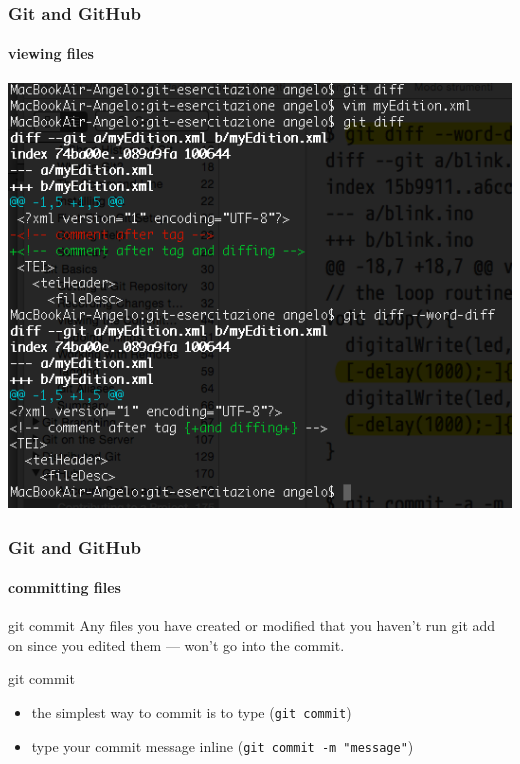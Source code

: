 \begin{frame}
	\frametitle{Git and GitHub}
    \framesubtitle{viewing files}
    \addtocounter{nframe}{1}
	
	\begin{center}
		\includegraphics[width=.8\textwidth]{imgs/Diffing-line-word.png}
	\end{center}

\end{frame}

\begin{frame}
	\frametitle{Git and GitHub}
    \framesubtitle{committing files}
    \addtocounter{nframe}{1}

	\begin{block}{git commit}
		Any files you have created or modified that you haven’t run git add on since you edited them — won’t go into the commit.
	\end{block}

	\begin{block}{git commit}
		\begin{itemize}
			\item the simplest way to commit is to type (\texttt{git commit})
			\item type your commit message inline  (\texttt{git commit -m "message"})
		\end{itemize}
	
	\end{block}

\end{frame}


